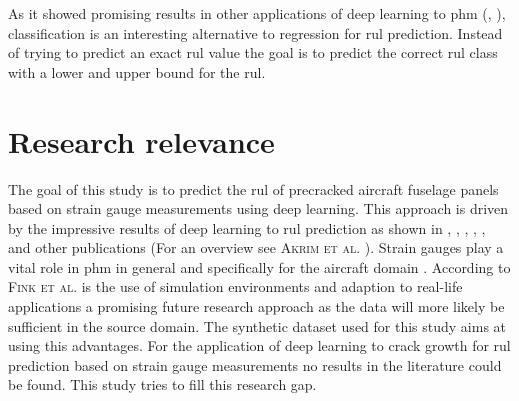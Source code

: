\documentclass[conference]{IEEEtran}
\begin{document}

As it showed promising results in other applications of deep learning to \gls{phm} (\cite{Liu2019a}, \cite{Xiao2016}), classification is an interesting alternative to regression for \gls{rul} prediction. Instead of trying to predict an exact \gls{rul} value the goal is to predict the correct \gls{rul} class with a lower and upper bound for the \gls{rul}.

\section{Research relevance}
\label{sec:research-relevance}

The goal of this study is to predict the \gls{rul} of precracked aircraft fuselage panels based on strain gauge measurements using deep learning. This approach is driven by the impressive results of deep learning to \gls{rul} prediction as shown in \cite{Xu2018}, \cite{Li2018}, \cite{Liu2019}, \cite{Yuan2016}, \cite{Wu2018}, \cite{Park2020} and other publications (For an overview see \textsc{Akrim et al.} \cite{Akrim2021}). Strain gauges play a vital role in \gls{phm} in general \cite{Tinga2019} and specifically for the aircraft domain \cite{Timothy2009}. According to \textsc{Fink et al.} \cite{Fink2020} is the use of simulation environments and adaption to real-life applications a promising future research approach as the data will more likely be sufficient in the source domain. The synthetic dataset used for this study aims at using this advantages. For the application of deep learning to crack growth for \gls{rul} prediction based on strain gauge measurements no results in the literature could be found. This study tries to fill this research gap.


\printbibliography
\end{document}
